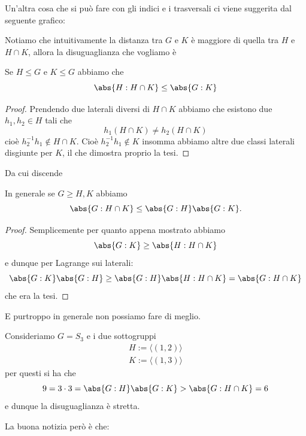 \documentclass[11pt]{scrartcl}
\begin{document}
	Un'altra cosa che si può fare con gli indici e i trasversali ci viene suggerita dal seguente grafico: 
		\begin{center}
		\end{center}
	Notiamo che intuitivamente la distanza tra $G$ e $K$ è maggiore di quella tra $H$ e $H\cap K$, allora la disuguaglianza che vogliamo è
	\begin{proposition}
		Se $H\le G$ e $K \le G$ abbiamo che 
		$$\abs{H:H\cap K}\le \abs{G:K}$$
	\end{proposition}
	\begin{proof}
		Prendendo due laterali diversi di $H\cap K$ abbiamo che esistono due $h_1,h_2\in H$ tali che
		$$h_1\left(H\cap K\right)\ne h_2\left(H\cap K\right)$$
		cioè $h_2^{-1}h_1 \not\in H\cap K$. Cioè $h_2^{-1}h_1\not\in K$ insomma abbiamo altre due classi laterali disgiunte per $K$, il che dimostra proprio la tesi.
	\end{proof}
	Da cui discende 
	\begin{corollary}
		In generale se $G\ge H,K$ abbiamo
		$$\abs{G:H\cap K}\le \abs{G:H}\abs{G:K}.$$
	\end{corollary}	
	\begin{proof}
		Semplicemente per quanto appena mostrato abbiamo 
		$$\abs{G:K}\ge \abs{H: H\cap K}$$
		e dunque per Lagrange sui laterali:
		$$\abs{G:K}\abs{G:H}\ge \abs{G:H}\abs{H:H\cap K}=\abs{G:H\cap K}$$
		che era la tesi.
	\end{proof}
	E purtroppo in generale non possiamo fare di meglio.
	\begin{example}
		Consideriamo $G=S_3$ e i due sottogruppi
		\begin{gather*}
			H:=\langle \left(1,2\right)\rangle \\
			K:=\langle \left(1,3\right)\rangle
		\end{gather*}
		per questi si ha che
		$$9=3\cdot 3 = \abs{G:H}\abs{G:K}>\abs{G:H\cap K}=6$$
		e dunque la disuguaglianza è stretta.
	\end{example}
	La buona notizia però è che:
\end{document}
